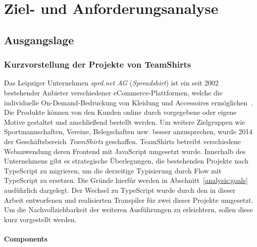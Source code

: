\chapter{Ziel- und Anforderungsanalyse}
\label{chap:analysis}

\section{Ausgangslage}
\label{sec:status-quo}


\subsection{Kurzvorstellung der Projekte von TeamShirts}

Das Leipziger Unternehmen \textit{sprd.net AG} (\textit{Spreadshirt}) ist ein seit 2002 bestehender Anbieter verschiedener eCommerce-Plattformen, welche die individuelle On-Demand-Bedruckung von Kleidung und Accessoires ermöglichen~\autocite{SPREADSHIRT:ABOUT}. Die Produkte können von den Kunden online durch vorgegebene oder eigene Motive gestaltet und anschließend bestellt werden. Um weitere Zielgruppen wie Sportmannschaften, Vereine, Belegschaften usw. besser anzusprechen, wurde 2014 der Geschäftsbereich \textit{TeamShirts} geschaffen.
TeamShirts betreibt verschiedene Webanwendung deren Frontend mit JavaScript umgesetzt wurde. Innerhalb des Unternehmens gibt es strategische Überlegungen, die bestehenden Projekte nach TypeScript zu migrieren, um die derzeitige Typisierung durch Flow mit TypeScript zu ersetzen. Die Gründe hierfür werden in Abschnitt~\ref{analysis:goals} ausführlich dargelegt. Der Wechsel zu TypeScript wurde durch den in dieser Arbeit entworfenen und realisierten Transpiler für zwei dieser Projekte umgesetzt. Um die Nachvollziehbarkeit der weiteren Ausführungen zu erleichtern, sollen diese kurz vorgestellt werden.

\subsubsection{Components}

